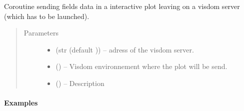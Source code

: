 \documentclass[letterpaper,10pt,english]{sphinxmanual}
\begin{document}

\begin{fulllineitems}
\label{\detokenize{triflow.plugins:triflow.plugins.displays.coroutine}}
\end{fulllineitems}


\begin{fulllineitems}
\label{\detokenize{triflow.plugins:triflow.plugins.displays.visdom_update}}
Coroutine sending fields data in a interactive plot leaving on a visdom
server (which has to be launched).
\begin{quote}\begin{description}
\item[{Parameters}] \leavevmode\begin{itemize}
\item {} 
 (str (default \sphinxquotedblleft{}\sphinxquotedblright{})) -- adress of the visdom server.

\item {} 
 (\sphinxstyleliteralemphasis{ (}\sphinxstyleliteralemphasis{)}\sphinxstyleliteralemphasis{}) -- Visdom environnement where the plot will be send.

\item {} 
 (\sphinxstyleliteralemphasis{, }) -- Description

\end{itemize}

\end{description}\end{quote}
\paragraph{Examples}


\end{fulllineitems}
\end{document}
